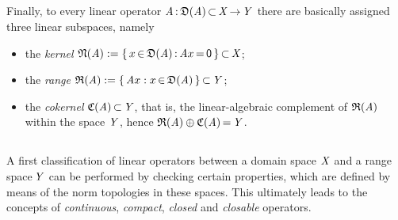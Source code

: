 \documentclass[11pt,twoside]{article}
\begin{document}
\subparagraph{} %
Finally,
to every linear operator $\mathit{A} {\,:\,} \mathfrak{D}(\mathit{A}) {\,\subset\,} \mathit{X} {\,\to\,} \mathit{Y}$
there are basically assigned three linear subspaces,
namely

\begin{itemize}[leftmargin=4mm]
\item[1.]
the \textit{kernel} $\mathfrak{N}(\mathit{A}) :=
\{\,x {\,\in\,} \mathfrak{D}(\mathit{A}) {\,:\,} \mathit{A} x {\,=\,} {\mathsf{0}}\,\} {\,\subset\,} \mathit{X}$;

\item[2.]
the \textit{range} $\mathfrak{R}(\mathit{A}) :=
\{\, \mathit{A} x: x {\,\in\,} \mathfrak{D}(\mathit{A})\,\} {\,\subset\,} \mathit{Y}$;

\item[3.]
the \textit{cokernel} $\mathfrak{C}{(\mathit{A})} {\,\subset\,} \mathit{Y}$,
that is,
the linear-algebraic complement of $\mathfrak{R}(\mathit{A})$ within the space $\mathit{Y}$,
hence
$\mathfrak{R}(\mathit{A}) \oplus \mathfrak{C}{(\mathit{A})} {\,=\,} \mathit{Y}$.
\end{itemize}

\subsection{} %
A first classification of linear operators
between a domain space $\mathit{X}$ and a range space\,$\mathit{Y}$
can be performed by checking certain properties,
which are defined by means of the norm topologies in these spaces.
This ultimately leads to the concepts of \textit{continuous}, \textit{compact},
\textit{closed} and \textit{closable} operators.
\end{document}
